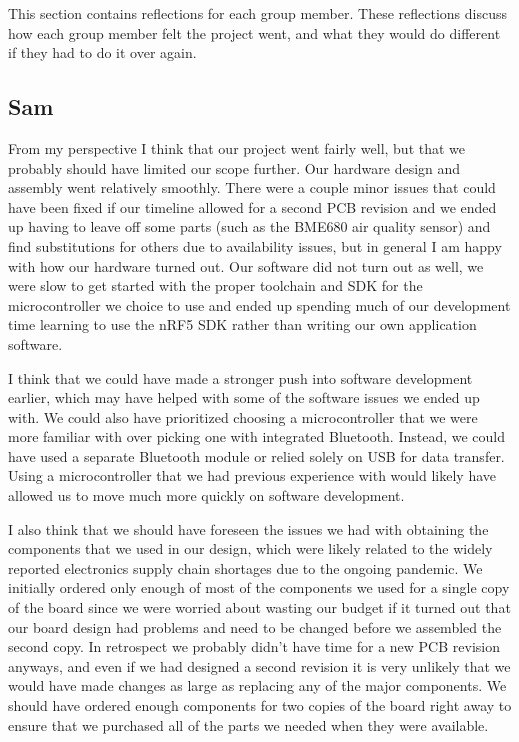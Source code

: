 This section contains reflections for each group member. These reflections
discuss how each group member felt the project went, and what they would do
different if they had to do it over again.

\subsection{Sam}

From my perspective I think that our project went fairly well, but that we
probably should have limited our scope further. Our hardware design and assembly
went relatively smoothly. There were a couple minor issues that could have been
fixed if our timeline allowed for a second PCB revision and we ended up having
to leave off some parts (such as the BME680 air quality sensor) and find
substitutions for others due to availability issues, but in general I am happy
with how our hardware turned out. Our software did not turn out as well, we
were slow to get started with the proper toolchain and SDK for the
microcontroller we choice to use and ended up spending much of our development
time learning to use the nRF5 SDK rather than writing our own application
software.

I think that we could have made a stronger push into software development
earlier, which may have helped with some of the software issues we ended up
with. We could also have prioritized choosing a microcontroller that we were
more familiar with over picking one with integrated Bluetooth. Instead, we could
have used a separate Bluetooth module or relied solely on USB for data transfer.
Using a microcontroller that we had previous experience with would likely have
allowed us to move much more quickly on software development.

I also think that we should have foreseen the issues we had with obtaining the
components that we used in our design, which were likely related to the widely
reported electronics supply chain shortages due to the ongoing pandemic. We
initially ordered only enough of most of the components we used for a single
copy of the board since we were worried about wasting our budget if it turned
out that our board design had problems and need to be changed before we
assembled the second copy. In retrospect we probably didn't have time for a new
PCB revision anyways, and even if we had designed a second revision it is very
unlikely that we would have made changes as large as replacing any of the major
components. We should have ordered enough components for two copies of the
board right away to ensure that we purchased all of the parts we needed when
they were available.

